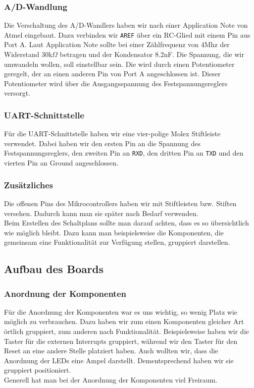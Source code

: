 \documentclass[]{article}
\begin{document}
\subsubsection{A/D-Wandlung}
Die Verschaltung des A/D-Wandlers haben wir nach einer Application Note von Atmel eingebaut. Dazu verbinden wir \texttt{AREF} über ein RC-Glied mit einem Pin aus Port A. Laut Application Note sollte bei einer Zählfrequenz von 4Mhz der Widerstand 30k$\Omega$ betragen und der Kondensator 8.2nF.
Die Spannung, die wir umwandeln wollen, soll einstellbar sein. Die wird durch einen Potentiometer geregelt, der an einen anderen Pin von Port A angeschlossen ist. Dieser Potentiometer wird über die Ausgangsspannung des Festspannungsreglers versorgt. 

\subsubsection{UART-Schnittstelle}
Für die UART-Schnittstelle haben wir eine vier-polige Molex Stiftleiste verwendet. Dabei haben wir den ersten Pin an die Spannung des Festspannungsreglers, den zweiten Pin an \texttt{RXD}, den dritten Pin an \texttt{TXD} und den vierten Pin an Ground angeschlossen.

\subsubsection{Zusätzliches}
Die offenen Pins des Mikrocontrollers haben wir mit Stiftleisten bzw. Stiften versehen. Dadurch kann man sie später nach Bedarf verwenden.
\\Beim Erstellen des Schaltplans sollte man darauf achten, dass es so übersichtlich wie möglich bleibt. Dazu kann man beispielsweise die Komponenten, die gemeinsam eine Funktionalität zur Verfügung stellen, gruppiert darstellen.

\subsection{Aufbau des Boards}
\subsubsection{Anordnung der Komponenten}
Für die Anordnung der Komponenten war es uns wichtig, so wenig Platz wie möglich zu verbrauchen. Dazu haben wir zum einen Komponenten gleicher Art örtlich gruppiert, zum anderen nach Funktionalität. Beispielsweise haben wir die Taster für die externen Interrupts gruppiert, während wir den Taster für den Reset an eine andere Stelle platziert haben. Auch wollten wir, dass die Anordnung der LEDs eine Ampel darstellt. Dementsprechend haben wir sie gruppiert positioniert.
\\Generell hat man bei der Anordnung der Komponenten viel Freiraum.
\end{document}
